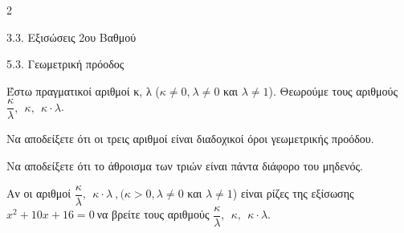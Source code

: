 \begin{ylh}{2}
    \item 3.3. Εξισώσεις 2ου Βαθμού
    \item 5.3. Γεωμετρική πρόοδος
\end{ylh}
Έστω πραγματικοί αριθμοί κ, λ ($\kappa \neq 0$,$\ \lambda \neq 0$ και $\lambda \neq 1$). Θεωρούμε τους αριθμούς $\dfrac{\kappa}{\lambda},\ \ \kappa,\ \ \kappa \cdot \lambda$.
\begin{alist}
\item Να αποδείξετε ότι οι τρεις αριθμοί είναι διαδοχικοί όροι γεωμετρικής προόδου.
\item Να αποδείξετε ότι το άθροισμα των τριών είναι πάντα διάφορο του μηδενός.

\item Αν οι αριθμοί $\dfrac{\kappa}{\lambda},\ \ \kappa \cdot \lambda\ ,(\kappa>0, \lambda \neq 0$ και $\lambda \neq 1$) είναι ρίζες της εξίσωσης $x^{2} + 10x + 16 = 0\ $να βρείτε τους αριθμούς $\dfrac{\kappa}{\lambda},\ \ \kappa,\ \ \kappa \cdot \lambda$.
\end{alist}

